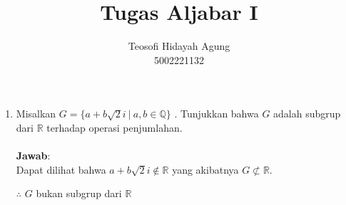 \documentclass{article}
\title{Tugas Aljabar I}
\author{Teosofi Hidayah Agung\\
5002221132}
\date{}
\begin{document}
\maketitle
{}
\setlength{\belowdisplayskip}{-4.5mm}
\setlength{\abovedisplayskip}{1.5mm}
\allowdisplaybreaks

\begin{enumerate}
    \item Misalkan $G = \{a + b\sqrt{2}i\:|\:a, b \in \mathbb{Q}\}$ . Tunjukkan bahwa $G$ adalah subgrup dari $\mathbb{R}$ terhadap operasi penjumlahan.\\~\\
    \textbf{Jawab}:\\
    Dapat dilihat bahwa $a+b\sqrt{2}i\notin\mathbb{R}$ yang akibatnya $G\not\subset\mathbb{R}$.
    
    \vspace{0.1mm}
    $\therefore$ $G$ bukan subgrup dari $\mathbb{R}$
    

\end{enumerate}
\end{document}
